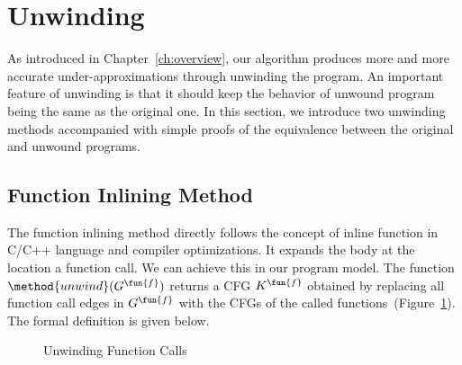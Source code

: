 
\section{Unwinding}\label{sec:unwinding}
As introduced in Chapter~\ref{ch:overview}, our algorithm produces more and more
accurate under-approximations through unwinding the program.
An important feature of unwinding is that it should keep the behavior of unwound
program being the same as the original one.
In this section, we introduce two unwinding methods accompanied with simple 
proofs of the equivalence between the original and unwound programs.

\subsection{Function Inlining Method}\label{subsec:inlining}
The function inlining method directly follows the concept of inline function in
C/C++ language and compiler optimizations.
It expands the body at the location a function call.
We can achieve this in our program model.
The function $\method{unwind}(G^\fun{f})$ returns a CFG $K^\fun{f}$
obtained by replacing all function call edges in $G^\fun{f}$ with the CFGs of
the called functions~(Figure~\ref{figure:unwinding}).
The formal definition is given below.

\begin{figure}[t]
  \centering

  \caption{Unwinding Function Calls}
  \label{figure:unwinding}
\end{figure}

